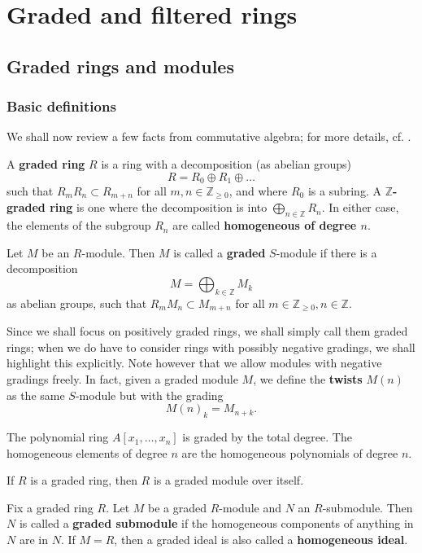 \chapter{Graded and filtered rings}

\section{Graded rings and modules}

\subsection{Basic definitions}
We shall now review  a few facts from commutative algebra; for more details,
cf. \cite{Bo61}.
\begin{definition} 
A \textbf{graded ring} $R$ is a ring with a decomposition (as abelian groups)
\[  R = R_0 \oplus R_1 \oplus \dots   \]
such that $R_m R_n \subset R_{m+n}$ for all $m, n \in \mathbb{Z}_{\geq 0}$,
and where $R_0$ is a subring.
A \textbf{$\mathbb{Z}$-graded ring} is one where the decomposition is into
$\bigoplus_{n \in \mathbb{Z}} R_n$.
In either case, the elements of the subgroup $R_n$ are called
\textbf{homogeneous of degree $n$}.

Let $M$ be an $R$-module. Then $M$ is called a \textbf{graded} $S$-module if
there is a decomposition
\[  M = \bigoplus_{k \in \mathbb{Z}} M_k  \]
as abelian groups, such that $R_m M_n \subset M_{m+n}$ for all $m \in
\mathbb{Z}_{\geq 0}, n \in \mathbb{Z}$.
\end{definition} 

Since we shall focus on positively graded rings, we shall simply call them
graded rings; when we do have to consider rings with possibly negative
gradings, we shall highlight this explicitly. Note however that we allow
modules with negative gradings freely.
In fact, given a graded module $M$, we define the \textbf{twists} $M(n)$ as the
same $S$-module but with the grading
\[  M(n)_k = M_{n+k} . \]  

\begin{example} 
The polynomial ring $A[x_1, \dots, x_n] $ is graded by the total degree. The
homogeneous elements of degree $n$ are the homogeneous polynomials of degree
$n$.
\end{example} 
\begin{example} 
If $R$ is  a graded ring, then $R$ is a graded module over itself. 
\end{example} 

\begin{definition} Fix a graded ring $R$.
Let $M$ be a graded $R$-module and $N$ an $R$-submodule. Then $N$ is called  a
\textbf{graded submodule} if the homogeneous components of anything in $N$ are
in $N$. If $M=R$, then a graded ideal is also called a \textbf{homogeneous
ideal}.
\end{definition} 

